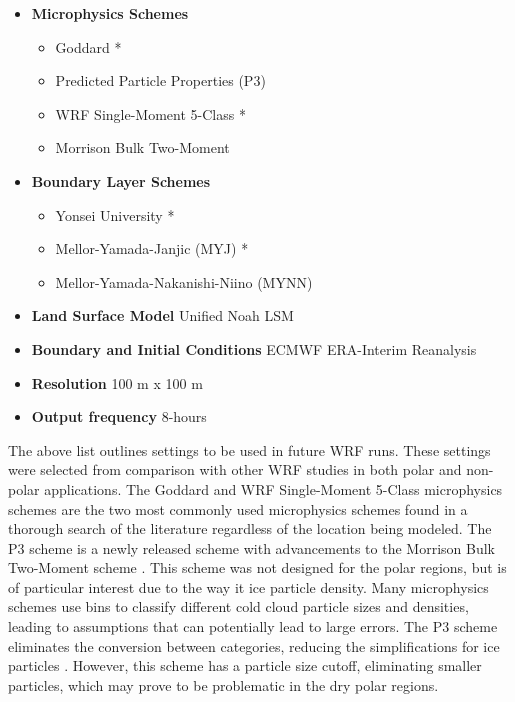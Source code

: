 \begin{itemize}
    \item \textbf{Microphysics Schemes}
    \begin{itemize}
        \item Goddard *
        \item Predicted Particle Properties (P3)
        \item WRF Single-Moment 5-Class *
        \item Morrison Bulk Two-Moment
    \end{itemize}
    \item \textbf{Boundary Layer Schemes}
    \begin{itemize}
        \item Yonsei University *
        \item Mellor-Yamada-Janjic (MYJ) *
        \item Mellor-Yamada-Nakanishi-Niino (MYNN)
        \end{itemize}
    \item \textbf{Land Surface Model} Unified Noah LSM
    \item \textbf{Boundary and Initial Conditions} ECMWF ERA-Interim Reanalysis
    \item \textbf{Resolution} 100 m x 100 m
    \item \textbf{Output frequency} 8-hours
\end{itemize}

The above list outlines settings to be used in future WRF runs. These settings were selected from comparison with other WRF studies in both polar and non-polar applications. The Goddard \cite{Tao:2000vs} and WRF Single-Moment 5-Class microphysics \cite{Hong:1913uy} schemes are the two most commonly used microphysics schemes found in a thorough search of the literature regardless of the location being modeled. The P3 scheme is a newly released scheme with advancements to the Morrison Bulk Two-Moment scheme \cite{Milbrandt:2016ko}. This scheme was not designed for the polar regions, but is of particular interest due to the way it ice particle density. Many microphysics schemes use bins to classify  different cold cloud particle sizes and densities, leading to assumptions that can potentially lead to large errors. The P3 scheme eliminates the conversion between categories, reducing the simplifications for ice particles \cite{Morrison:2005ga}. However, this scheme has a particle size cutoff, eliminating smaller particles, which may prove to be problematic in the dry polar regions.

